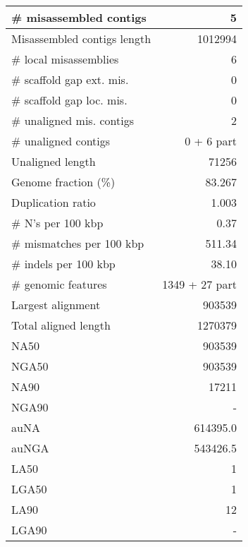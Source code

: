 \documentclass[12pt,a4paper]{article}
\begin{document}
\begin{table}[ht]
\begin{center}
\begin{tabular}{|l*{1}{|r}|}
\# misassembled contigs & 5 \\ \hline
Misassembled contigs length & 1012994 \\ \hline
\# local misassemblies & 6 \\ \hline
\# scaffold gap ext. mis. & 0 \\ \hline
\# scaffold gap loc. mis. & 0 \\ \hline
\# unaligned mis. contigs & 2 \\ \hline
\# unaligned contigs & 0 + 6 part \\ \hline
Unaligned length & 71256 \\ \hline
Genome fraction (\%) & 83.267 \\ \hline
Duplication ratio & 1.003 \\ \hline
\# N's per 100 kbp & 0.37 \\ \hline
\# mismatches per 100 kbp & 511.34 \\ \hline
\# indels per 100 kbp & 38.10 \\ \hline
\# genomic features & 1349 + 27 part \\ \hline
Largest alignment & 903539 \\ \hline
Total aligned length & 1270379 \\ \hline
NA50 & 903539 \\ \hline
NGA50 & 903539 \\ \hline
NA90 & 17211 \\ \hline
NGA90 & - \\ \hline
auNA & 614395.0 \\ \hline
auNGA & 543426.5 \\ \hline
LA50 & 1 \\ \hline
LGA50 & 1 \\ \hline
LA90 & 12 \\ \hline
LGA90 & - \\ \hline
\end{tabular}
\end{center}
\end{table}
\end{document}
